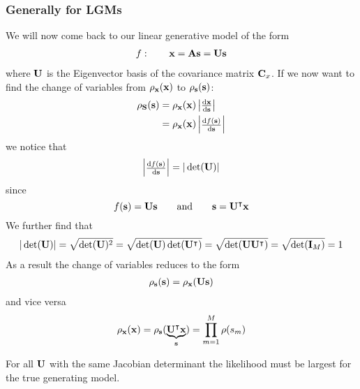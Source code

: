 \subsubsection{Generally for LGMs}
We will now come back to our linear generative model of the form
\begin{align*}
	f: \qquad \mathbf{x} = \mathbf{A s} = \mathbf{U s}
\end{align*}
where $\mathbf{U}$ is the Eigenvector basis of the covariance matrix $\mathbf{C}_x$.
If we now want to find the change of variables from $\rho_{\mathbf{x}}(\mathbf{x})$ to $\rho_{\mathbf{s}}(\mathbf{s})$:
\begin{align}
	\rho_{\mathbf{S}}(\mathbf{s}) 
	&= \rho_{\mathbf{x}}(\mathbf{x})  \begin{vmatrix}\frac{\mathrm{d}\mathbf{x}}{\mathrm{d}\mathbf{s}}\end{vmatrix} \nonumber \\
	&= \rho_{\mathbf{x}}(\mathbf{x})  \begin{vmatrix}\frac{\mathrm{d}f(\mathbf{s})}{\mathrm{d}\mathbf{s}}\end{vmatrix}
\end{align}
we notice that
\begin{align}
	\begin{vmatrix}\frac{\mathrm{d}f(\mathbf{s})}{\mathrm{d}\mathbf{s}}\end{vmatrix} = |\det(\mathbf{U})|
\end{align}
since
\begin{equation*}
		f(\mathbf{s}) = \mathbf{U s}  \qquad \text{and} \qquad
		\mathbf{s} = \mathbf{U^\intercal x}                                   
\end{equation*}
We further find that
\begin{align*}
	|\det(\mb{U})| = \sqrt{\det(\mb{U})^2} %
	               = \sqrt{\det(\mb{U}) \det(\mb{U}\TT)} %
	               = \sqrt{\det(\mb{U U\TT})} %
	               = \sqrt{\det(\imat_M)} %
	               = 1
\end{align*}
As a result the change of variables reduces to the form
\begin{align}
	\rho_{\mathbf{s}}(\mathbf{s}) = \rho_{\mathbf{x}}(\mathbf{U s})
\end{align}
and vice versa
\begin{align}
	\rho_{\mathbf{x}}(\mathbf{x}) = \rho_{\mathbf{s}}(\underbrace{\mathbf{U^\intercal x}}_{\mathbf{s}})
	                      = \prod_{m=1}^M \rho(s_m)
\end{align}
\begin{proposition}
For all $\mathbf{U}$ with the same Jacobian determinant the likelihood must be largest
for the true generating model.
\end{proposition}